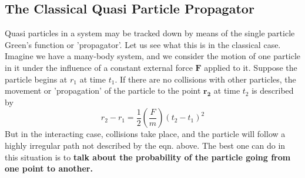 \subsection{The Classical Quasi Particle Propagator}
Quasi particles in a system may be tracked down by means of the single particle Green's function or 'propagator'. Let us see what this is in the classical case. Imagine we have a many-body system, and we consider the
motion of one particle in it under the influence of a constant external force $\mathbf{F}$ applied to it. Suppose the particle begins at $r_1$ at time $t_1$. If there are no collisions with other particles, the movement or 'propagation' of the particle to the point $\mathbf{r_2}$ at time $t_2$ is described by
\begin{equation}r_{2}-r_{1}=\frac{1}{2}\left(\frac{F}{m}\right)\left(t_{2}-t_{1}\right)^{2}\end{equation}
But in the interacting case, collisions take place, and the particle will follow a highly irregular path not described by the eqn. above. The best one can do in this situation is to \textbf{talk about the probability of the particle going from one point  to another.} 

